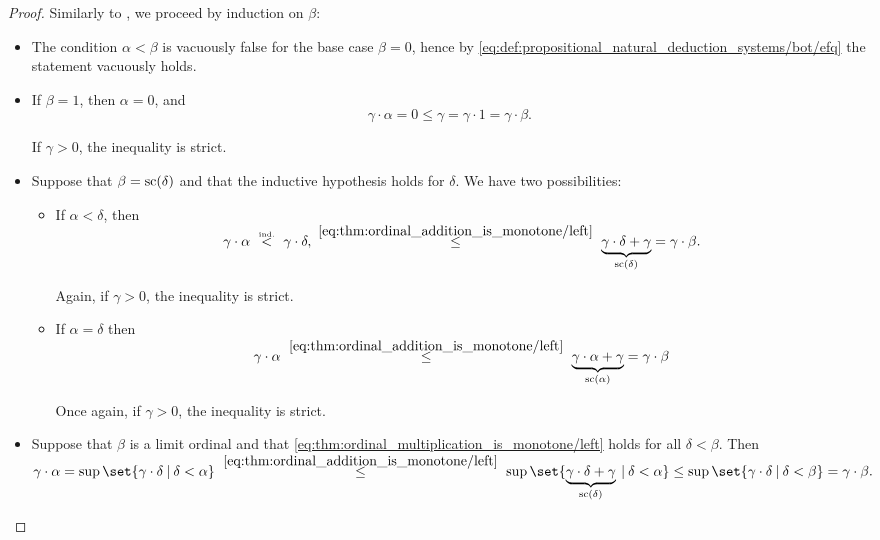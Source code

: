 \begin{proof}
   Similarly to , we proceed by induction on \( \beta \):
  \begin{itemize}
    \item The condition \( \alpha < \beta \) is vacuously false for the base case \( \beta = 0 \), hence by \eqref{eq:def:propositional_natural_deduction_systems/bot/efq} the statement vacuously holds.

    \item If \( \beta = 1 \), then \( \alpha = 0 \), and
    \begin{equation}\label{thm:ordinal_multiplication_is_monotone/left/ind_base}
      \gamma \cdot \alpha = 0 \leq \gamma = \gamma \cdot 1 = \gamma \cdot \beta.
    \end{equation}

    If \( \gamma > 0 \), the inequality is strict.

    \item Suppose that \( \beta = \op{sc}(\delta) \) and that the inductive hypothesis holds for \( \delta \). We have two possibilities:
    \begin{itemize}
      \item If \( \alpha < \delta \), then
      \begin{equation*}
        \gamma \cdot \alpha
        \reloset {\T{ind.}} <
        \gamma \cdot \delta,
        \reloset {\eqref{eq:thm:ordinal_addition_is_monotone/left}} \leq
        \underbrace{\gamma \cdot \delta + \gamma}_{\op{sc}(\delta)}
        =
        \gamma \cdot \beta.
      \end{equation*}

      Again, if \( \gamma > 0 \), the inequality is strict.

      \item If \( \alpha = \delta \) then
      \begin{equation*}
        \gamma \cdot \alpha
        \reloset {\eqref{eq:thm:ordinal_addition_is_monotone/left}} \leq
        \underbrace{\gamma \cdot \alpha + \gamma}_{\op{sc}(\alpha)}
        =
        \gamma \cdot \beta
      \end{equation*}

      Once again, if \( \gamma > 0 \), the inequality is strict.
    \end{itemize}

    \item Suppose that \( \beta \) is a limit ordinal and that \eqref{eq:thm:ordinal_multiplication_is_monotone/left} holds for all \( \delta < \beta \). Then
    \begin{equation*}
      \gamma \cdot \alpha
      =
      \sup\set{ \gamma \cdot \delta \given \delta < \alpha }
      \reloset {\eqref{eq:thm:ordinal_addition_is_monotone/left}} \leq
      \sup\set{ \underbrace{\gamma \cdot \delta + \gamma}_{\op{sc}(\delta)} \given \delta < \alpha }
      \leq
      \sup\set{ \gamma \cdot \delta \given \delta < \beta }
      =
      \gamma \cdot \beta.
    \end{equation*}


\end{itemize}
\end{proof}
